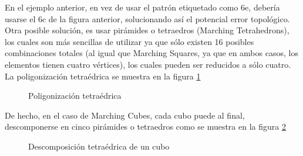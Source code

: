 En el ejemplo anterior, en vez de usar el patrón etiquetado como 6e, debería usarse el 6c 
de la figura anterior, solucionando así el potencial error topológico.
Otra posible solución, es usar pirámides o tetraedros (Marching Tetrahedrons), los cuales 
son más sencillas de utilizar ya que sólo existen 16 posibles combinaciones totales (al igual que 
Marching Squares, ya que en ambos casos, los elementos tienen cuatro vértices), los cuales 
pueden ser reducidos a sólo cuatro. La poligonización tetraédrica se muestra en la figura \ref{f:estadoDelArte:image_004}

\begin{figure}[hbp]
\centering
\caption{Poligonización tetraédrica}
\label{f:estadoDelArte:image_004}
\end{figure}

De hecho, en el caso de Marching Cubes, cada cubo puede al final, descomponerse en 
cinco pirámides o tetraedros como se muestra en la figura \ref{f:estadoDelArte:image_006}

\begin{figure}[hbp]
\centering
\caption{Descomposición tetraédrica de un cubo}
\label{f:estadoDelArte:image_006}
\end{figure}
